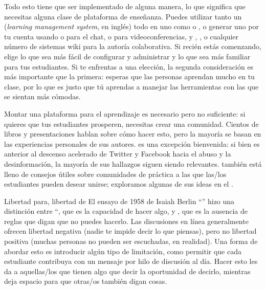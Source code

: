 Todo esto tiene que ser implementado de alguna manera,
lo que significa que necesitas alguna clase de plataforma de enseñanza.
Puedes utilizar tanto un  (\emph{learning management system}, en inglés) todo en uno
como  o ,
o generar uno por tu cuenta
usando  o  para el chat,
o  para videoconferencias,
y ,
,
o cualquier número de sistemas wiki para la autoría colaborativa.
Si recién estás comenzando,
elige lo que sea más fácil de configurar y administrar
y lo que sea más familiar para tus estudiantes.
Si te enfrentas a una elección,
la segunda consideración es más importante que la primera:
esperas que las personas aprendan mucho en tu clase,
por lo que es justo que tú aprendas a manejar las herramientas con las que se sientan más cómodas.

Montar una plataforma para el aprendizaje es necesario pero no suficiente:
si quieres que tus estudiantes prosperen,
necesitas crear una comunidad.
Cientos de libros y presentaciones hablan sobre cómo hacer esto,
pero la mayoría se basan en las experiencias personales de sus autores.
\cite{Krau2016} es una excepción bienvenida:
si bien es anterior al descenso acelerado de Twitter y Facebook hacia el abuso y la desinformación,
la mayoría de sus hallazgos siguen siendo relevantes.
\cite{Foge2005} también está lleno de consejos útiles
sobre comunidades de práctica a las que las/los estudiantes pueden desear unirse;
exploramos algunas de sus ideas en el .

\begin{aside}{Libertad para, libertad de}
  El ensayo de 1958 de Isaiah Berlin
  ``''
  hizo una distinción entre ``,
  que es la capacidad de hacer algo,
  y ,
  que es la ausencia de reglas que digan que no puedes hacerlo.
  Las discusiones en línea generalmente ofrecen libertad negativa
  (nadie te impide decir lo que piensas),
  pero no libertad positiva
  (muchas personas no pueden ser escuchadas, en realidad).
  Una forma de abordar esto es introducir algún tipo de limitación,
  como permitir que cada estudiante contribuya con un mensaje por hilo de discusión al día.
  Hacer esto les da a aquellas/los que tienen algo que decir la oportunidad de decirlo,
  mientras deja espacio para que otras/os también digan cosas.
\end{aside}

